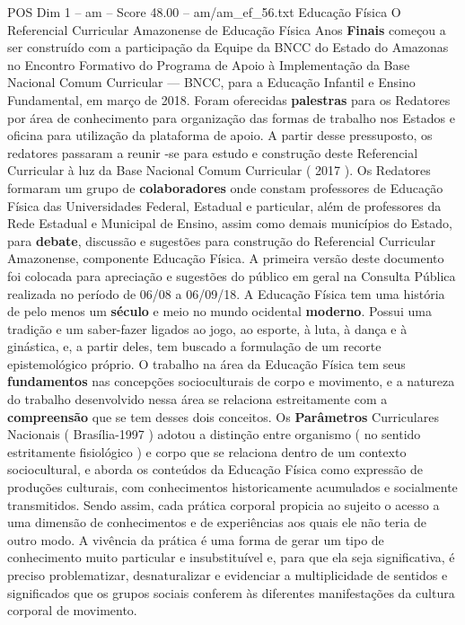 \begin{textsample}{POS Dim 1 – am – Score 48.00 – am/am\_ef\_56.txt}  \label{ex:f1_pos_227}
Educação Física O Referencial Curricular Amazonense de Educação Física Anos \textbf{Finais} começou a ser construído com a participação da Equipe da BNCC do Estado do Amazonas no Encontro Formativo do Programa de Apoio à Implementação da Base Nacional Comum Curricular — BNCC, para a Educação Infantil e Ensino Fundamental, em março de 2018.
Foram oferecidas \textbf{palestras} para os Redatores por área de conhecimento para organização das formas de trabalho nos Estados e oficina para utilização da plataforma de apoio.
A partir desse pressuposto, os redatores passaram a reunir -se para estudo e construção deste Referencial Curricular à luz da Base Nacional Comum Curricular ( 2017 ).
Os Redatores formaram um grupo de \textbf{colaboradores} onde constam professores de Educação Física das Universidades Federal, Estadual e particular, além de professores da Rede Estadual e Municipal de Ensino, assim como demais municípios do Estado, para \textbf{debate}, discussão e sugestões para construção do Referencial Curricular Amazonense, componente Educação Física.
A primeira versão deste documento foi colocada para apreciação e sugestões do público em geral na Consulta Pública realizada no período de 06/08 a 06/09/18.
A Educação Física tem uma história de pelo menos um \textbf{século} e meio no mundo ocidental \textbf{moderno}.
Possui uma tradição e um saber-fazer ligados ao jogo, ao esporte, à luta, à dança e à ginástica, e, a partir deles, tem buscado a formulação de um recorte epistemológico próprio.
O trabalho na área da Educação Física tem seus \textbf{fundamentos} nas concepções socioculturais de corpo e movimento, e a natureza do trabalho desenvolvido nessa área se relaciona estreitamente com a \textbf{compreensão} que se tem desses dois conceitos.
Os \textbf{Parâmetros} Curriculares Nacionais ( Brasília-1997 ) adotou a distinção entre organismo ( no sentido estritamente fisiológico ) e corpo que se relaciona dentro de um contexto sociocultural, e aborda os conteúdos da Educação Física como expressão de produções culturais, com conhecimentos historicamente acumulados e socialmente transmitidos.
Sendo assim, cada prática corporal propicia ao sujeito o acesso a uma dimensão de conhecimentos e de experiências aos quais ele não teria de outro modo.
A vivência da prática é uma forma de gerar um tipo de conhecimento muito particular e insubstituível e, para que ela seja significativa, é preciso problematizar, desnaturalizar e evidenciar a multiplicidade de sentidos e significados que os grupos sociais conferem às diferentes manifestações da cultura corporal de movimento.

\end{textsample}
